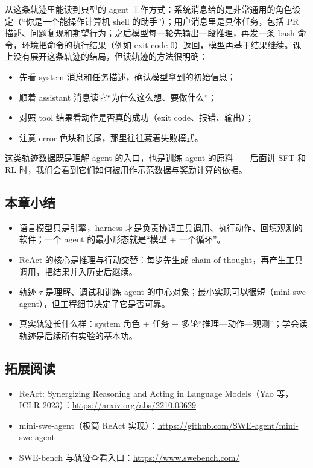 \documentclass[a4paper]{article}
\begin{document}
从这条轨迹里能读到典型的 agent 工作方式：系统消息给的是非常通用的角色设定（“你是一个能操作计算机 shell 的助手”）；用户消息里是具体任务，包括 PR 描述、问题复现和期望行为；之后模型每一轮先输出一段推理，再发一条 bash 命令，环境把命令的执行结果（例如 exit code 0）返回，模型再基于结果继续。课上没有展开这条轨迹的结局，但读轨迹的方法很明确：

\begin{itemize}
\item 先看 system 消息和任务描述，确认模型拿到的初始信息；
\item 顺着 assistant 消息读它“为什么这么想、要做什么”；
\item 对照 tool 结果看动作是否真的成功（exit code、报错、输出）；
\item 注意 error 色块和长尾，那里往往藏着失败模式。
\end{itemize}

这类轨迹数据既是理解 agent 的入口，也是训练 agent 的原料——后面讲 SFT 和 RL 时，我们会看到它们如何被用作示范数据与奖励计算的依据。

\subsection{本章小结}

\begin{itemize}
\item 语言模型只是引擎，harness 才是负责协调工具调用、执行动作、回填观测的软件；一个 agent 的最小形态就是“模型 + 一个循环”。
\item ReAct 的核心是推理与行动交替：每步先生成 chain of thought，再产生工具调用，把结果并入历史后继续。
\item 轨迹 $\tau$ 是理解、调试和训练 agent 的中心对象；最小实现可以很短（mini-swe-agent），但工程细节决定了它是否可靠。
\item 真实轨迹长什么样：system 角色 + 任务 + 多轮“推理—动作—观测”；学会读轨迹是后续所有实验的基本功。
\end{itemize}

\subsection{拓展阅读}

\begin{itemize}
\item ReAct: Synergizing Reasoning and Acting in Language Models（Yao 等，ICLR 2023）：\url{https://arxiv.org/abs/2210.03629}
\item mini-swe-agent（极简 ReAct 实现）：\url{https://github.com/SWE-agent/mini-swe-agent}
\item SWE-bench 与轨迹查看入口：\url{https://www.swebench.com/}
\end{itemize}
\end{document}

